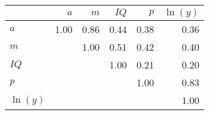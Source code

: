 \begin{tabular}{lrrrrr}
\hline
 & $a$  & $m$  & $IQ$  & $p$  & $\ln(y)$  \\ 
\hline
$a$ & 1.00  & 0.86  & 0.44  & 0.38  & 0.36  \\ 
$m$ &   & 1.00  & 0.51  & 0.42  & 0.40  \\ 
$IQ$ &   &   & 1.00  & 0.21  & 0.20  \\ 
$p$ &   &   &   & 1.00  & 0.83  \\ 
$\ln(y)$ &   &   &   &   & 1.00  \\ 
\hline
\end{tabular}%
